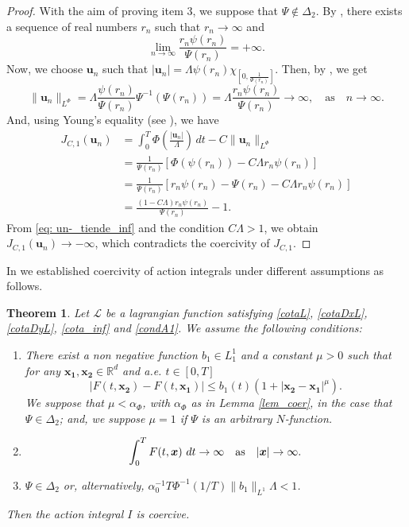 \documentclass[twoside]{article}
\newtheorem{thm}{Theorem}[section]
\theoremstyle{remark}
\newcommand{\orlnor}{\|_{L^{\Phi}}}
\renewcommand{\b}[1]{\boldsymbol{#1}}
\newcommand{\rr}{\mathbb{R}}
\renewcommand{\leq}{\leqslant}
\begin{document}
\begin{proof}
With the aim of proving item 3, we suppose that $\Psi \notin \Delta_2$. 
By \cite[Thm. 4.1]{KR},  there exists a sequence of real  numbers  $r_n$ such that
$r_n \to \infty$ and 
\begin{equation}\label{eq: un-_tiende_inf}
\lim\limits_{n \to \infty} \frac{r_n \psi(r_n)}{\Psi(r_n)}=+\infty.
\end{equation}
Now, we choose $\b{u}_n$ such that
$|\b{u}_n|=\Lambda\psi(r_n)\chi_{[0,\frac{1}{\Psi(r_n)}]}$. Then, 
by \cite[Eq. (9.11)]{KR}, we get 
\[
\|\b{u}_n\orlnor =\Lambda\frac{\psi(r_n)}{\Psi(r_n)}\Psi^{-1}(\Psi(r_n))=
\Lambda\frac{r_n\psi(r_n)}{\Psi(r_n)}\to \infty,\quad\text{as}\quad n \to \infty.
\]
And, using Young's equality (see \cite[Eq. (2.7)]{KR}), we have
\[
\begin{split}
J_{C,1}(\b{u}_n)&=\int_0^T \Phi\left(\frac{|\b{u}_n|}{\Lambda}\right)\,dt-C\|\b{u}_n\orlnor\\
&=
\frac{1}{\Psi(r_n)}\left[\Phi(\psi(r_n))  -C\Lambda r_n\psi(r_n)\right]\\
&=
\frac{1}{\Psi(r_n)} \left[ r_n\psi(r_n)-\Psi(r_n)- C\Lambda r_n\psi(r_n) \right]\\
&=\frac{(1- C\Lambda) r_n\psi(r_n)}{\Psi(r_n)}-1.
\end{split}
\]
From \eqref{eq: un-_tiende_inf} and the condition $C\Lambda>1$, we obtain  $J_{C,1}(\b{u}_n)\to-\infty$, which contradicts the coercivity  of $J_{C,1}$.
\end{proof}




In \cite{ABGMS2015} we established coercivity of action integrals under different assumptions as follows. 



\begin{thm}\label{coercitividad1}
Let  $\mathcal{L}$ be a lagrangian function satisfying \eqref{cotaL}, \eqref{cotaDxL}, \eqref{cotaDyL}, \eqref{cota_inf} and \eqref{condA1}. We assume the following conditions:
\begin{enumerate}
\item There exist a non negative function  $b_1 \in L^1_1$ and a constant $\mu>0$  such that for any $\b{x_1},\b{x_2}\in\rr^d$ and a.e. $t\in [0,T]$
\begin{equation}\label{holder_cont}
  \left| F(t,\b{x_2})- F(t,\b{x_1}) \right|\leq b_1(t)(1+|\b{x_2}-\b{x_1}|^{\mu}).
\end{equation}
We suppose that $\mu< \alpha_{\Phi}$,  with $\alpha_{\Phi}$ as in Lemma \ref{lem_coer}, in the case that $\Psi\in\Delta_2$; and, we suppose $\mu=1$  if $\Psi$ is an  arbitrary $N$-function. 
\item
\begin{equation}\label{propiedad1coercividad}
\int_{0}^{T}F(t,\b{x})\ dt \rightarrow \infty \quad \hbox{as} \quad |\b{x}|\rightarrow \infty.
\end{equation}
\item\label{hipot_coer}  $\Psi\in\Delta_2$ or, alternatively, 
$\alpha_0^{-1}T\Phi^{-1}\left(1/T\right)\|b_1\|_{L^1}\Lambda<1$.
\end{enumerate}
Then  the action integral $I$ is coercive.
\end{thm}
\end{document}

